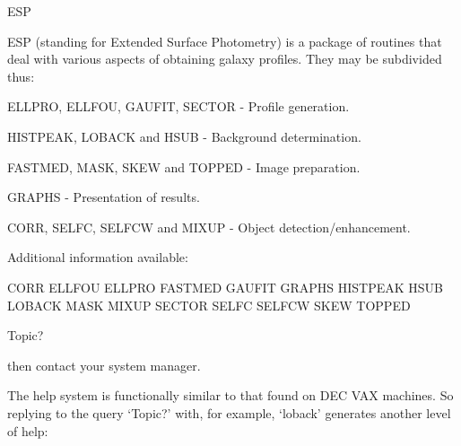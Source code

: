 \documentclass[twoside,11pt]{starlink}
\begin{document}
\begin{small}
\begin{terminalv}
 ESP

     ESP (standing for Extended Surface Photometry) is a package of
     routines that deal with various aspects of obtaining galaxy profiles.
     They may be subdivided thus:


     ELLPRO, ELLFOU, GAUFIT, SECTOR -  Profile generation.

     HISTPEAK, LOBACK and HSUB      -  Background determination.

     FASTMED, MASK, SKEW and TOPPED -  Image preparation.

     GRAPHS                         -  Presentation of results.

     CORR, SELFC, SELFCW and MIXUP  -  Object detection/enhancement.

   Additional information available:

   CORR       ELLFOU     ELLPRO     FASTMED    GAUFIT     GRAPHS     HISTPEAK
   HSUB       LOBACK     MASK       MIXUP      SECTOR     SELFC      SELFCW
   SKEW       TOPPED

 Topic?
 \end{terminalv}
\end{small}

then contact your system manager.

The help system is functionally  similar to that found on DEC VAX machines.
So replying to the query `Topic?' with, for example, `loback' generates
another level of help:
\end{document}
